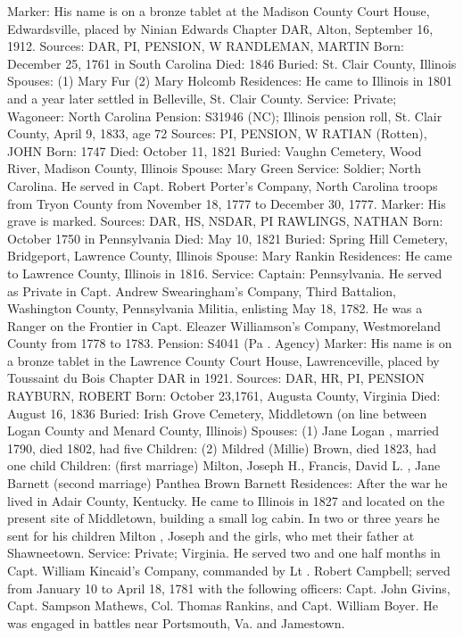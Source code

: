 Marker: His name is on a bronze tablet at the Madison County Court House, Edwardsville, placed by Ninian Edwards Chapter DAR, Alton, September 16, 1912. 
Sources: DAR, PI, PENSION, W 
RANDLEMAN, MARTIN 
Born: December 25, 1761 in South Carolina
Died: 1846
Buried: St. Clair County, Illinois
Spouses:  (1) Mary Fur 
	  (2) Mary Holcomb 
Residences: He came to Illinois in 1801 and a year later settled in Belleville, St. Clair County.
Service: Private; Wagoneer: North Carolina 
Pension: S31946 (NC); Illinois pension roll, St. Clair County, April 9, 1833, age 72
Sources: PI, PENSION, W 
RATIAN (Rotten), JOHN
Born: 1747
Died: October 11, 1821
Buried: Vaughn Cemetery, Wood River, Madison County, Illinois 
Spouse: Mary Green
Service: Soldier; North Carolina. He served in Capt. Robert Porter's Company, North Carolina troops from Tryon County from November 18, 1777 to December 30, 1777.
Marker: His grave is marked. 
Sources: DAR, HS, NSDAR, PI 
RAWLINGS, NATHAN 
Born: October 1750 in Pennsylvania 
Died: May 10, 1821 
Buried: Spring Hill Cemetery, Bridgeport, Lawrence County, Illinois 
Spouse: Mary Rankin 
Residences: He came to Lawrence County, Illinois in 1816. 
Service: Captain: Pennsylvania. He served as Private in Capt. Andrew Swearingham's Company, Third Battalion, Washington County, Pennsylvania Militia, enlisting May 18, 1782. He was a Ranger on the Frontier in Capt. Eleazer Williamson's Company, Westmoreland County from 1778 to 1783. 
Pension: S4041 (Pa . Agency)
Marker: His name is on a bronze tablet in the Lawrence County Court House, Lawrenceville, placed by Toussaint du Bois Chapter DAR in 1921. 
Sources: DAR, HR, PI, PENSION 
RAYBURN, ROBERT
Born: October 23,1761, Augusta County, Virginia
Died: August 16, 1836 
Buried: Irish Grove Cemetery, Middletown (on line between Logan County and Menard County, Illinois) 
Spouses:  (1) Jane Logan , married 1790, died 1802, had five Children: 
	(2) Mildred (Millie) Brown, died 1823, had one child 
Children: (first marriage) Milton, Joseph H., Francis, David L. , Jane Barnett 
	(second marriage) Panthea Brown Barnett 
Residences: After the war he lived in Adair County, Kentucky. He came to Illi­nois in 1827 and located on the present site of Middletown, building a small log cabin. In two or three years he sent for his children Milton , Joseph and the girls, who met their father at Shawneetown. 
Service: Private; Virginia. He served two and one half months in Capt. William Kincaid's Company, commanded by Lt . Robert Campbell; served from Jan­uary 10 to April 18, 1781 with the following officers: Capt. John Givins, Capt. Sampson Mathews, Col. Thomas Rankins, and Capt. William Boyer. He was engaged in battles near Portsmouth, Va. and Jamestown. 

